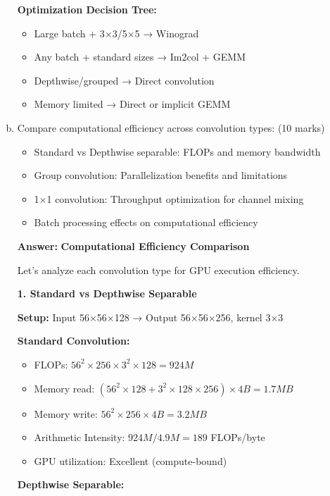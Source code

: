 \documentclass[12pt]{article}
\newcommand{\answer}[1]{{\color{answercolor}\textbf{Answer:} #1}}
\newcommand{\explanation}[1]{{\color{explanationcolor}#1}}
\begin{document}
\begin{enumerate}[(a)]
{{    \textbf{Optimization Decision Tree:}
    \begin{itemize}
        \item Large batch + 3×3/5×5 → Winograd
        \item Any batch + standard sizes → Im2col + GEMM
        \item Depthwise/grouped → Direct convolution
        \item Memory limited → Direct or implicit GEMM
    \end{itemize}
    }
    }
    
    \item Compare computational efficiency across convolution types: \hfill (10 marks)
    \begin{itemize}
        \item Standard vs Depthwise separable: FLOPs and memory bandwidth
        \item Group convolution: Parallelization benefits and limitations
        \item 1×1 convolution: Throughput optimization for channel mixing
        \item Batch processing effects on computational efficiency
    \end{itemize}
    
    \answer{
    \textbf{Computational Efficiency Comparison}
    
    \explanation{
    Let's analyze each convolution type for GPU execution efficiency.
    }
    
    \textbf{1. Standard vs Depthwise Separable}
    
    \explanation{
    \textbf{Setup:} Input 56×56×128 → Output 56×56×256, kernel 3×3
    
    \textbf{Standard Convolution:}
    \begin{itemize}
        \item FLOPs: $56^2 \times 256 \times 3^2 \times 128 = 924M$
        \item Memory read: $(56^2 \times 128 + 3^2 \times 128 \times 256) \times 4B = 1.7MB$
        \item Memory write: $56^2 \times 256 \times 4B = 3.2MB$
        \item Arithmetic Intensity: $924M / 4.9M = 189$ FLOPs/byte
        \item GPU utilization: Excellent (compute-bound)
    \end{itemize}
    
    \textbf{Depthwise Separable:}
    
}}
\end{enumerate}
\end{document}
